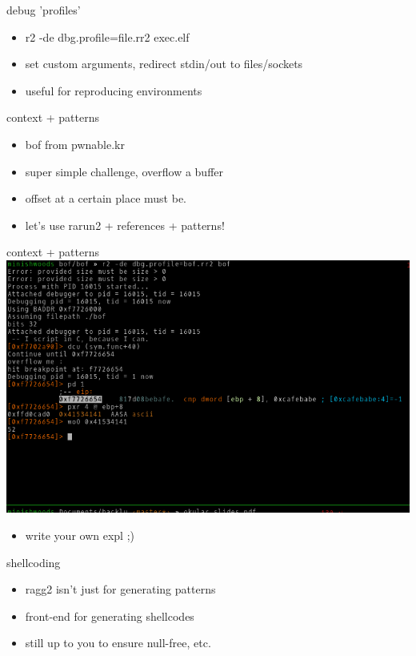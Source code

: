 \documentclass[10pt,pdf,utf8,english,compress,hyperref={unicode}]{beamer}
\begin{document}
\begin{frame}{debug 'profiles'}
	\begin{itemize}
		\item r2 -de dbg.profile=file.rr2 exec.elf
		\item set custom arguments, redirect stdin/out to files/sockets
		\item useful for reproducing environments
	\end{itemize}
\end{frame}

\begin{frame}{context + patterns}
	\begin{itemize}
		\item bof from pwnable.kr
		\item super simple challenge, overflow a buffer
		\item offset at a certain place must be.
		\item let's use rarun2 + references + patterns!
	\end{itemize}
\end{frame}

\begin{frame}{context + patterns}
	\includegraphics[width=\textwidth]{cr_images/bof1.png}
	\begin{itemize}
		\item write your own expl ;)
	\end{itemize}
\end{frame}


\begin{frame}{shellcoding}
	\begin{itemize}
		\item ragg2 isn't just for generating patterns
		\item front-end for generating shellcodes
		\item still up to you to ensure null-free, etc.
	\end{itemize}
\end{frame}
\end{document}
